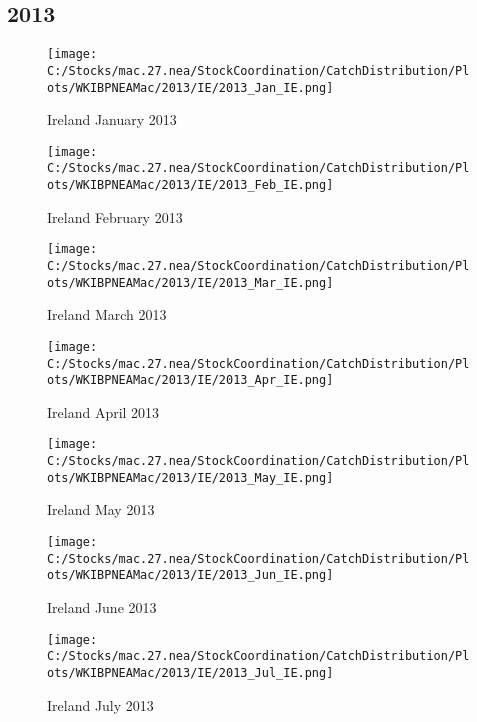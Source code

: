 \documentclass{article}
\begin{document}
\subsection{2013}



\begin{figure}[h]
	\centering
		\texttt{[image: C:/Stocks/mac.27.nea/StockCoordination/CatchDistribution/Plots/WKIBPNEAMac/2013/IE/2013\_Jan\_IE.png]}
	\caption{Ireland January 2013}
	\label{fig:2013_Jan_IE}
\end{figure}

\begin{figure}
	\centering
		\texttt{[image: C:/Stocks/mac.27.nea/StockCoordination/CatchDistribution/Plots/WKIBPNEAMac/2013/IE/2013\_Feb\_IE.png]}
	\caption{Ireland February 2013}
	\label{fig:2013_Feb_IE}
\end{figure}

\begin{figure}
	\centering
		\texttt{[image: C:/Stocks/mac.27.nea/StockCoordination/CatchDistribution/Plots/WKIBPNEAMac/2013/IE/2013\_Mar\_IE.png]}
	\caption{Ireland March 2013}
	\label{fig:2013_Mar_IE}
\end{figure}

\begin{figure}
	\centering
		\texttt{[image: C:/Stocks/mac.27.nea/StockCoordination/CatchDistribution/Plots/WKIBPNEAMac/2013/IE/2013\_Apr\_IE.png]}
	\caption{Ireland April 2013}
	\label{fig:2013_Apr_IE}
\end{figure}

\begin{figure}
	\centering
		\texttt{[image: C:/Stocks/mac.27.nea/StockCoordination/CatchDistribution/Plots/WKIBPNEAMac/2013/IE/2013\_May\_IE.png]}
	\caption{Ireland May 2013}
	\label{fig:2013_May_IE}
\end{figure}

\begin{figure}
	\centering
		\texttt{[image: C:/Stocks/mac.27.nea/StockCoordination/CatchDistribution/Plots/WKIBPNEAMac/2013/IE/2013\_Jun\_IE.png]}
	\caption{Ireland June 2013}
	\label{fig:2013_Jun_IE}
\end{figure}

\begin{figure}
	\centering
		\texttt{[image: C:/Stocks/mac.27.nea/StockCoordination/CatchDistribution/Plots/WKIBPNEAMac/2013/IE/2013\_Jul\_IE.png]}
	\caption{Ireland July 2013}
	\label{fig:2013_Jul_IE}
\end{figure}
\end{document}
